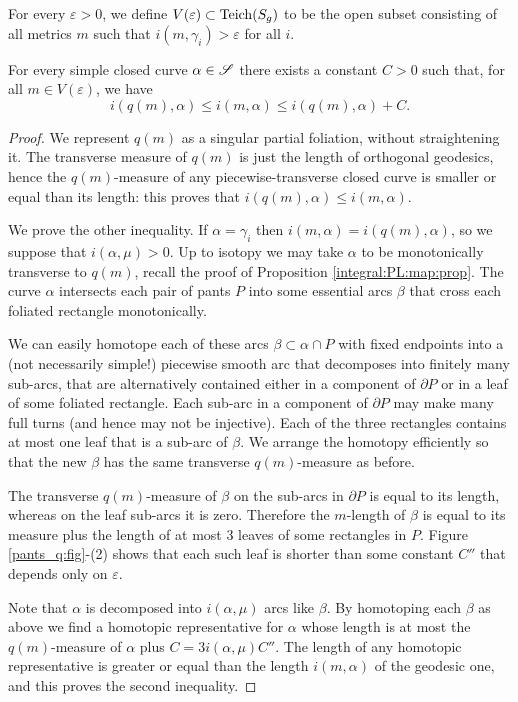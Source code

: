 For every $\varepsilon > 0$, we define $V(\varepsilon) \subset {\rm Teich}(S_g)$ to be the open subset consisting of all metrics $m$ such that $i(m,\gamma_i)>\varepsilon$ for all $i$.

\begin{lemma}
For every simple closed curve $\alpha\in \mathscr{S}$ there exists a constant $C>0$ such that, for all $m\in V(\varepsilon)$, we have
$$i(q(m),\alpha) \leqslant i (m,\alpha) \leqslant i(q(m), \alpha) + C.$$
\end{lemma}
\begin{proof}
We represent $q(m)$ as a singular partial foliation, without straightening it. The transverse measure of $q(m)$ is just the length of orthogonal geodesics, hence the $q(m)$-measure of any piecewise-transverse closed curve is smaller or equal than its length: this proves that  $i(q(m),\alpha) \leqslant i (m,\alpha)$.

We prove the other inequality. If $\alpha = \gamma_i$ then $i(m,\alpha) = i(q(m),\alpha)$, so we suppose that $i(\alpha, \mu)>0$. Up to isotopy we may take $\alpha$ to be monotonically transverse to $q(m)$, recall the proof of Proposition \ref{integral:PL:map:prop}. The curve $\alpha$ intersects each pair of pants $P$ into some essential arcs $\beta$ that cross each foliated rectangle monotonically. 

We can easily homotope each of these arcs $\beta \subset \alpha\cap P$ with fixed endpoints into a (not necessarily simple!) piecewise smooth arc that decomposes into finitely many sub-arcs, that are alternatively contained either in a component of $\partial P$ or in a leaf of some foliated rectangle. Each sub-arc in a component of $\partial P$ may make many full turns (and hence may not be injective). Each of the three rectangles contains at most one leaf that is a sub-arc of $\beta$. We arrange the homotopy efficiently so that the new $\beta$ has the same transverse $q(m)$-measure as before.

The transverse $q(m)$-measure of $\beta$ on the sub-arcs in $\partial P$ is equal to its length, whereas on the leaf sub-arcs it is zero. Therefore the $m$-length of $\beta$ is equal to its measure plus the length of at most 3 leaves of some rectangles in $P$. Figure \ref{pants_q:fig}-(2) shows that each such leaf is shorter than some constant $C''$ that depends only on $\varepsilon$. 

Note that $\alpha$ is decomposed into $i(\alpha, \mu)$ arcs like $\beta$.
By homotoping each $\beta$ as above we find a homotopic representative for $\alpha$ whose length is at most the $q(m)$-measure of $\alpha$ plus $C=3i(\alpha,\mu)C''$. The length of any homotopic representative is greater or equal than the length $i(m,\alpha)$ of the geodesic one, and this proves the second inequality.
\end{proof}

